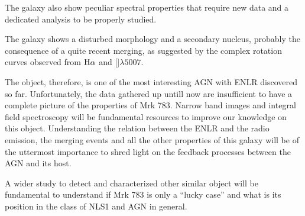 \documentclass[../main.tex]{subfiles}
\begin{document}
The galaxy also show peculiar spectral properties that require new data and a dedicated analysis to be properly studied.

The galaxy shows a disturbed morphology and a secondary nucleus, probably the consequence of a quite recent merging, as suggested by the complex rotation curves observed from $\rm H\alpha$ and []$\lambda5007$.

The object, therefore, is one of the most interesting AGN with ENLR discovered so far.
Unfortunately, the data gathered up untill now are insufficient to have a complete picture of the properties of Mrk 783.
Narrow band images and integral field spectroscopy will be fundamental resources to improve our knowledge on this object.
Understanding the relation between the ENLR and the radio emission, the merging events and all the other properties of this galaxy will be of the uttermost importance to shred light on the feedback processes between the AGN and its host. 

A wider study to detect and characterized other similar object will be fundamental to understand if Mrk 783 is only a ``lucky case'' and what is its position in the class of NLS1 and AGN in general. 



























\biblio
\end{document}

